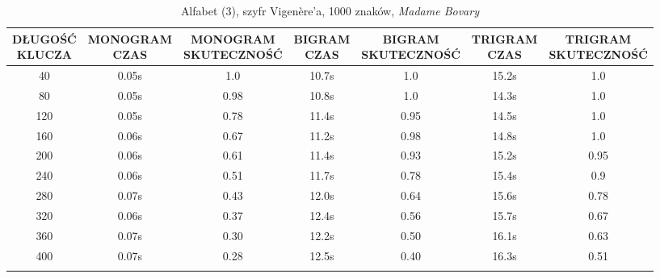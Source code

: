 \documentclass[a4paper]{article}
\theoremstyle{defn}
\theoremstyle{theorem}
\theoremstyle{lemma}
\theoremstyle{cor}
\theoremstyle{fact}
\begin{document}
\begin{center}\begin{small}\begin{longtable}{|c|c|c|c|c|c|c|} 
\hline \makecell{DŁUGOŚĆ\\KLUCZA} &  \makecell{MONOGRAM\\CZAS} & \makecell{MONOGRAM\\SKUTECZNOŚĆ} & \makecell{BIGRAM\\CZAS} &  \makecell{BIGRAM\\SKUTECZNOŚĆ} & \makecell{TRIGRAM\\CZAS} & \makecell{TRIGRAM\\SKUTECZNOŚĆ}\\ \hline 
40 & 0.05s & 1.0 & 10.7s & 1.0 & 15.2s & 1.0 \\ \hline 
80 & 0.05s & 0.98 & 10.8s & 1.0 & 14.3s & 1.0 \\ \hline 
120 & 0.05s & 0.78 & 11.4s & 0.95 & 14.5s & 1.0 \\ \hline 
160 & 0.06s & 0.67 & 11.2s & 0.98 & 14.8s & 1.0 \\ \hline 
200 & 0.06s & 0.61 & 11.4s & 0.93 & 15.2s & 0.95 \\ \hline 
240 & 0.06s & 0.51 & 11.7s & 0.78 & 15.4s & 0.9 \\ \hline 
280 & 0.07s & 0.43 & 12.0s & 0.64 & 15.6s & 0.78 \\ \hline 
320 & 0.06s & 0.37 & 12.4s & 0.56 & 15.7s & 0.67 \\ \hline 
360 & 0.07s & 0.30 & 12.2s & 0.50 & 16.1s & 0.63 \\ \hline 
400 & 0.07s & 0.28 & 12.5s & 0.40 & 16.3s & 0.51 \\ \hline 
\caption{Alfabet (3), szyfr Vigenère'a, 1000 znaków, \textit{Madame Bovary}}
\end{longtable}\end{small}\end{center} 
\end{document}
